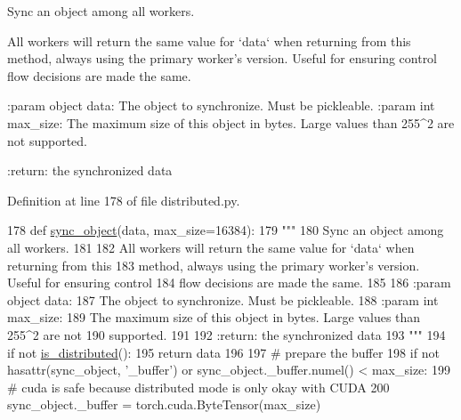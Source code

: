 \begin{DoxyVerb}Sync an object among all workers.

All workers will return the same value for `data` when returning from this
method, always using the primary worker's version. Useful for ensuring control
flow decisions are made the same.

:param object data:
    The object to synchronize. Must be pickleable.
:param int max_size:
    The maximum size of this object in bytes. Large values than 255^2 are not
    supported.

:return: the synchronized data
\end{DoxyVerb}
 

Definition at line 178 of file distributed.\+py.


\begin{DoxyCode}
178 \textcolor{keyword}{def }\hyperlink{namespaceparlai_1_1utils_1_1distributed_a269d3c7284127d9b287b9b61e9161de6}{sync\_object}(data, max\_size=16384):
179     \textcolor{stringliteral}{"""}
180 \textcolor{stringliteral}{    Sync an object among all workers.}
181 \textcolor{stringliteral}{}
182 \textcolor{stringliteral}{    All workers will return the same value for `data` when returning from this}
183 \textcolor{stringliteral}{    method, always using the primary worker's version. Useful for ensuring control}
184 \textcolor{stringliteral}{    flow decisions are made the same.}
185 \textcolor{stringliteral}{}
186 \textcolor{stringliteral}{    :param object data:}
187 \textcolor{stringliteral}{        The object to synchronize. Must be pickleable.}
188 \textcolor{stringliteral}{    :param int max\_size:}
189 \textcolor{stringliteral}{        The maximum size of this object in bytes. Large values than 255^2 are not}
190 \textcolor{stringliteral}{        supported.}
191 \textcolor{stringliteral}{}
192 \textcolor{stringliteral}{    :return: the synchronized data}
193 \textcolor{stringliteral}{    """}
194     \textcolor{keywordflow}{if} \textcolor{keywordflow}{not} \hyperlink{namespaceparlai_1_1utils_1_1distributed_a023acb5e3b66e1f27e21247c35661279}{is\_distributed}():
195         \textcolor{keywordflow}{return} data
196 
197     \textcolor{comment}{# prepare the buffer}
198     \textcolor{keywordflow}{if} \textcolor{keywordflow}{not} hasattr(sync\_object, \textcolor{stringliteral}{'\_buffer'}) \textcolor{keywordflow}{or} sync\_object.\_buffer.numel() < max\_size:
199         \textcolor{comment}{# cuda is safe because distributed mode is only okay with CUDA}
200         sync\_object.\_buffer = torch.cuda.ByteTensor(max\_size)

\end{DoxyCode}
